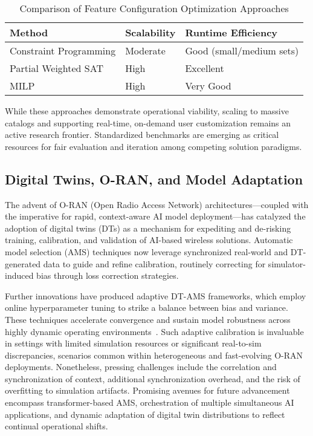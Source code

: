 \documentclass[11pt]{article}
\begin{document}
\begin{table}[h]
\centering
\caption{Comparison of Feature Configuration Optimization Approaches}
\label{tab:feature_config_methods}
\begin{tabular}{|l|l|l|}
\hline
\textbf{Method} & \textbf{Scalability} & \textbf{Runtime Efficiency} \\
\hline
Constraint Programming     & Moderate         & Good (small/medium sets)   \\
Partial Weighted SAT       & High             & Excellent                  \\
MILP                      & High             & Very Good                  \\
\hline
\end{tabular}
\end{table}

While these approaches demonstrate operational viability, scaling to massive catalogs and supporting real-time, on-demand user customization remains an active research frontier. Standardized benchmarks are emerging as critical resources for fair evaluation and iteration among competing solution paradigms.

\subsection{Digital Twins, O-RAN, and Model Adaptation}

The advent of O-RAN (Open Radio Access Network) architectures—coupled with the imperative for rapid, context-aware AI model deployment—has catalyzed the adoption of digital twins (DTs) as a mechanism for expediting and de-risking training, calibration, and validation of AI-based wireless solutions. Automatic model selection (AMS) techniques now leverage synchronized real-world and DT-generated data to guide and refine calibration, routinely correcting for simulator-induced bias through loss correction strategies.

Further innovations have produced adaptive DT-AMS frameworks, which employ online hyperparameter tuning to strike a balance between bias and variance. These techniques accelerate convergence and sustain model robustness across highly dynamic operating environments~\cite{ref37}. Such adaptive calibration is invaluable in settings with limited simulation resources or significant real-to-sim discrepancies, scenarios common within heterogeneous and fast-evolving O-RAN deployments. Nonetheless, pressing challenges include the correlation and synchronization of context, additional synchronization overhead, and the risk of overfitting to simulation artifacts. Promising avenues for future advancement encompass transformer-based AMS, orchestration of multiple simultaneous AI applications, and dynamic adaptation of digital twin distributions to reflect continual operational shifts.
\end{document}
